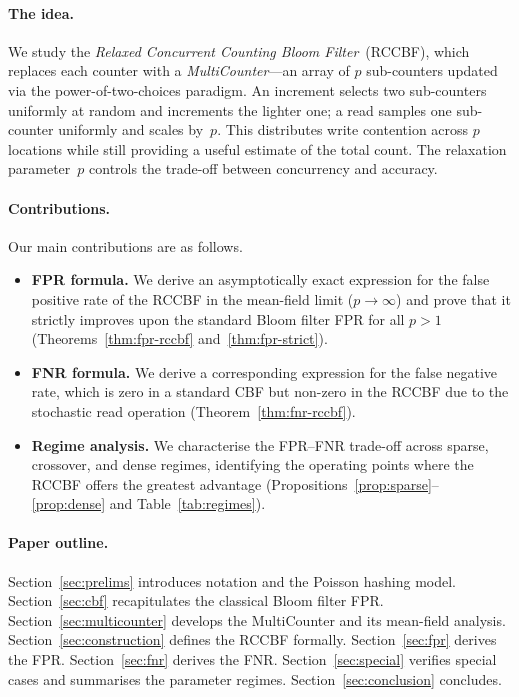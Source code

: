 \documentclass[11pt,a4paper]{article}
\newcommand{\CBF}{\textsf{CBF}}
\newcommand{\RCCBF}{\textsf{RCCBF}}
\begin{document}
\paragraph{The idea.}
We study the \emph{Relaxed Concurrent Counting Bloom Filter}~(\RCCBF{}),
which replaces each counter with a \emph{MultiCounter}---an array of $p$
sub-counters updated via the power-of-two-choices paradigm.  An increment
selects two sub-counters uniformly at random and increments the lighter
one; a read samples one sub-counter uniformly and scales by~$p$.  This
distributes write contention across $p$ locations while still providing
a useful estimate of the total count.  The relaxation parameter~$p$
controls the trade-off between concurrency and accuracy.

\paragraph{Contributions.}
Our main contributions are as follows.
\begin{itemize}
  \item \textbf{FPR formula.}  We derive an asymptotically exact
        expression for the false positive rate of the \RCCBF{} in the
        mean-field limit ($p \to \infty$) and prove that it strictly
        improves upon the standard Bloom filter FPR for all $p > 1$
        (Theorems~\ref{thm:fpr-rccbf} and~\ref{thm:fpr-strict}).
  \item \textbf{FNR formula.}  We derive a corresponding expression for
        the false negative rate, which is zero in a standard \CBF{} but
        non-zero in the \RCCBF{} due to the stochastic read operation
        (Theorem~\ref{thm:fnr-rccbf}).
  \item \textbf{Regime analysis.}  We characterise the FPR--FNR trade-off
        across sparse, crossover, and dense regimes, identifying the
        operating points where the \RCCBF{} offers the greatest advantage
        (Propositions~\ref{prop:sparse}--\ref{prop:dense} and
        Table~\ref{tab:regimes}).
\end{itemize}

\paragraph{Paper outline.}
Section~\ref{sec:prelims} introduces notation and the Poisson hashing
model.  Section~\ref{sec:cbf} recapitulates the classical Bloom filter
FPR.  Section~\ref{sec:multicounter} develops the MultiCounter and its
mean-field analysis.  Section~\ref{sec:construction} defines the \RCCBF{}
formally.  Section~\ref{sec:fpr} derives the FPR.
Section~\ref{sec:fnr} derives the FNR.  Section~\ref{sec:special}
verifies special cases and summarises the parameter regimes.
Section~\ref{sec:conclusion} concludes.
\end{document}
